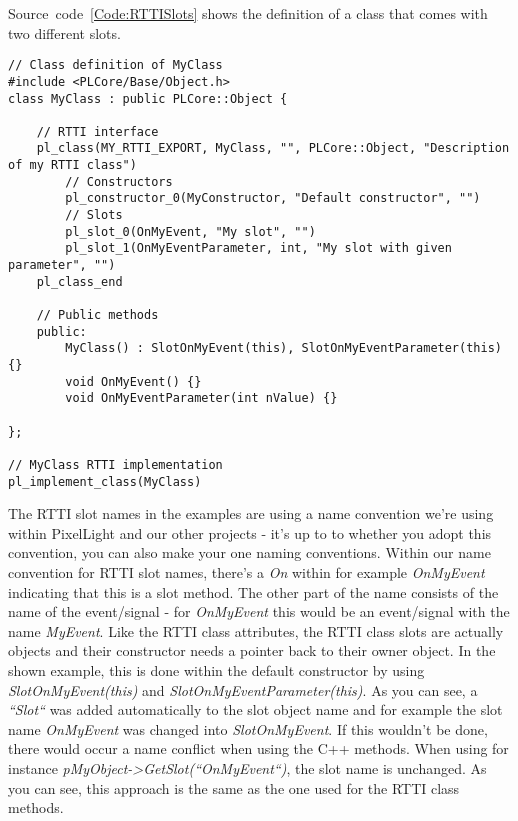 Source~code~\ref{Code:RTTISlots} shows the definition of a class that comes with two different slots.
\begin{lstlisting}[label=Code:RTTISlots,caption={Definition of RTTI class slots with parameters}]
// Class definition of MyClass
#include <PLCore/Base/Object.h>
class MyClass : public PLCore::Object {

	// RTTI interface
	pl_class(MY_RTTI_EXPORT, MyClass, "", PLCore::Object, "Description of my RTTI class")
		// Constructors
		pl_constructor_0(MyConstructor, "Default constructor", "")
		// Slots
		pl_slot_0(OnMyEvent, "My slot", "")
		pl_slot_1(OnMyEventParameter, int, "My slot with given parameter", "")
	pl_class_end

	// Public methods
	public:
		MyClass() : SlotOnMyEvent(this), SlotOnMyEventParameter(this) {}
		void OnMyEvent() {}
		void OnMyEventParameter(int nValue) {}

};

// MyClass RTTI implementation
pl_implement_class(MyClass)
\end{lstlisting}
The RTTI slot names in the examples are using a name convention we're using within PixelLight and our other projects - it's up to to whether you adopt this convention, you can also make your one naming conventions. Within our name convention for RTTI slot names, there's a \emph{On} within for example \emph{OnMyEvent} indicating that this is a slot method. The other part of the name consists of the name of the event/signal - for \emph{OnMyEvent} this would be an event/signal with the name \emph{MyEvent}. Like the RTTI class attributes, the RTTI class slots are actually objects and their constructor needs a pointer back to their owner object. In the shown example, this is done within the default constructor by using \emph{SlotOnMyEvent(this)} and \emph{SlotOnMyEventParameter(this)}. As you can see, a \emph{``Slot``} was added automatically to the slot object name and for example the slot name \emph{OnMyEvent} was changed into \emph{SlotOnMyEvent}. If this wouldn't be done, there would occur a name conflict when using the C++ methods. When using for instance \emph{pMyObject->GetSlot(``OnMyEvent``)}, the slot name is unchanged. As you can see, this approach is the same as the one used for the RTTI class methods.

